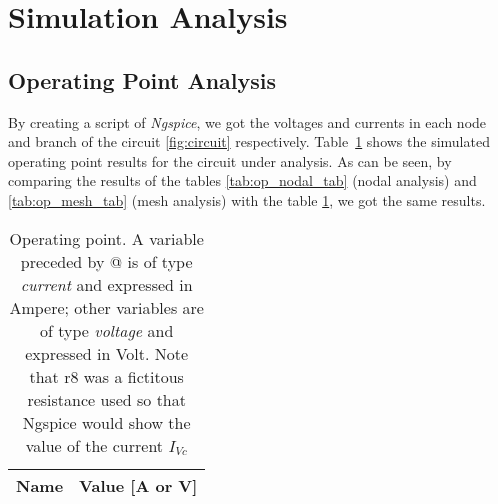 \section{Simulation Analysis}
\label{sec:simulation}

\subsection{Operating Point Analysis}

By creating a script of \textit{Ngspice}, we got the voltages and currents in each node and branch of
the circuit \ref{fig:circuit} respectively. Table~\ref{tab:op_tab} shows the simulated operating point results for the circuit
under analysis.
\hfill
As can be seen, by comparing the results of the tables \ref{tab:op_nodal_tab} (nodal analysis) and \ref{tab:op_mesh_tab} (mesh analysis)
with the table \ref{tab:op_tab}, we got the same results.

\begin{table}[ht]
  \centering
  \begin{tabular}{|l|r|}
    \hline
    {\bf Name} & {\bf Value [A or V]} \\ \hline
    
  \end{tabular}
  \caption{Operating point. A variable preceded by @ is of type {\em current}
    and expressed in Ampere; other variables are of type {\it voltage} and expressed in
    Volt. Note that r8 was a fictitous resistance used so that Ngspice would show the value of the current $I_{Vc}$}
  \label{tab:op_tab}
\end{table}






